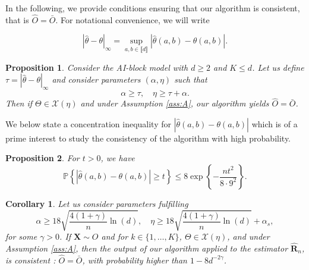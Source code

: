 \documentclass[11pt]{article}
\newtheorem{proposition}{Proposition}
\newtheorem{corollary}{Corollary}
\begin{document}
	In the following, we provide conditions ensuring that our algorithm is consistent, that is $\hat{O} = \bar{O}$. For notational convenience, we will write
	
	\begin{equation*}
		|\hat{\theta} - \theta |_{\infty} = \underset{a,b \in \llbracket d \rrbracket}{\sup} |\hat{\theta}(a,b) - \theta(a,b)|.
	\end{equation*}
	
	\begin{proposition}
		\label{prop:exact_recovery}
		Consider the AI-block model with $d \geq 2$ and $K \leq d$. Let us define $\tau = |\hat{\theta} - \theta|_{\infty}$ and consider parameters $(\alpha, \eta)$ such that
		\begin{equation}
			\label{eq:condition_consistent_recovery}
			\alpha \geq \tau, \quad \eta \geq \tau + \alpha.
		\end{equation}
		Then if $\Theta \in \mathcal{X}(\eta)$ and under Assumption \ref{ass:A}, our algorithm yields $\hat{O} = \bar{O}$.
	\end{proposition}
	
	We below state a concentration inequality for $|\hat{\theta}(a,b) - \theta(a,b)|$ which is of a prime interest to study the consistency of the algorithm with high probability.
	
	\begin{proposition}
	\label{prop:concentration_inequality}
		For $t >0$, we have
		\begin{equation*}
			\mathbb{P}\left\{ |\hat{\theta}(a,b) - \theta(a,b) | \geq t \right\} \leq 8 \exp\left\{ - \frac{n t^2}{8 \cdot 9^2}\right\}.
		\end{equation*}
	\end{proposition}
	
	\begin{corollary}
		\label{corr:exact_recovery}
		Let us consider parameters fulfilling 
		\begin{equation*}
		\alpha \geq 18 \sqrt{\frac{4(1+\gamma)}{n} \ln(d)}, \quad \eta \geq  18 \sqrt{\frac{4(1+\gamma)}{n} \ln(d)} + \alpha_s,
		\end{equation*}
		for some $\gamma > 0$. If $\textbf{X} \sim O$ and for $k \in \{1,\dots, K\}$, $\Theta \in \mathcal{X}(\eta)$, and under Assumption \ref{ass:A}, then the output of our algorithm applied to the estimator $\hat{\textbf{R}}_n$, is consistent : $\hat{O} = \bar{O}$, with probability higher than $1-8d^{-2\gamma}$.
	\end{corollary}
	
\end{document}
